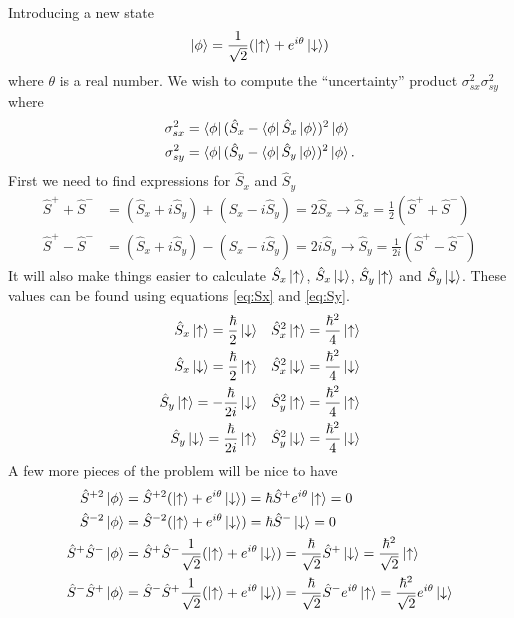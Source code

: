 \documentclass{article}
\begin{document}
Introducing a new state
\begin{equation*}
\ket{\phi}=\frac{1}{\sqrt{2}}(\ket{\uparrow}+e^{i\theta}\ket{\downarrow})
\end{equation*}
where $\theta$ is a real number. We wish to compute the ``uncertainty'' product $\sigma_{sx}^2\sigma_{sy}^2$ where
\begin{align*}
\sigma_{sx}^2 &= \bra{\phi}(\hat{S}_x-\bra{\phi}\hat{S}_x\ket{\phi} )^2\ket{\phi}  \\
\sigma_{sy}^2 &= \bra{\phi}(\hat{S}_y-\bra{\phi}\hat{S}_y\ket{\phi} )^2\ket{\phi}.
\end{align*}
First we need to find expressions for $\hat{S}_x$ and $\hat{S}_y$
\begin{align}
\label{eq:Sx}
\hat{S}^++\hat{S}^- &= (\hat{S}_x + i\hat{S}_y) + (\hat{S}_x-i\hat{S}_y) = 2\hat{S}_x 
\rightarrow \hat{S}_x = \frac{1}{2}(\hat{S}^++\hat{S}^-)\\
\label{eq:Sy}
\hat{S}^+-\hat{S}^- &= (\hat{S}_x + i\hat{S}_y) - (\hat{S}_x-i\hat{S}_y) = 2i\hat{S}_y 
\rightarrow \hat{S}_y = \frac{1}{2i}(\hat{S}^+-\hat{S}^-)
\end{align}
It will also make things easier to calculate $\hat{S}_x\ket{\uparrow}$, $\hat{S}_x\ket{\downarrow}$, $\hat{S}_y\ket{\uparrow}$ and $\hat{S}_y\ket{\downarrow}$. These values can be found using equations \ref{eq:Sx} and \ref{eq:Sy}.
\begin{align*}
\hat{S}_x\ket{\uparrow}		= \frac{\hbar}{2}\ket{\downarrow}& \quad
\hat{S}^2_x\ket{\uparrow}	= \frac{\hbar^2}{4}\ket{\uparrow}\\
\hat{S}_x\ket{\downarrow}	= \frac{\hbar}{2}\ket{\uparrow}& \quad
\hat{S}^2_x\ket{\downarrow}	= \frac{\hbar^2}{4}\ket{\downarrow}\\
\hat{S}_y\ket{\uparrow}		= -\frac{\hbar}{2i}\ket{\downarrow}& \quad
\hat{S}^2_y\ket{\uparrow}	= \frac{\hbar^2}{4}\ket{\uparrow}\\
\hat{S}_y\ket{\downarrow}	= \frac{\hbar}{2i}\ket{\uparrow}& \quad
\hat{S}^2_y\ket{\downarrow}	= \frac{\hbar^2}{4}\ket{\downarrow}\\
\end{align*}
A few more pieces of the problem will be nice to have
\begin{align*}
\hat{S}^{+2}\ket{\phi}&=\hat{S}^{+2}(\ket{\uparrow}+e^{i\theta}\ket{\downarrow})=\hbar\hat{S}^{+}e^{i\theta}\ket{\uparrow}=0 \\
\hat{S}^{-2}\ket{\phi}&=\hat{S}^{-2}(\ket{\uparrow}+e^{i\theta}\ket{\downarrow})=\hbar\hat{S}^{-}\ket{\downarrow}=0 \\
\hat{S}^+\hat{S}^-\ket{\phi}&=\hat{S}^+\hat{S}^-\frac{1}{\sqrt{2}}(\ket{\uparrow}+e^{i\theta}\ket{\downarrow})=\frac{\hbar}{\sqrt{2}}\hat{S}^+\ket{\downarrow} = \frac{\hbar^2}{\sqrt{2}}\ket{\uparrow} \\
\hat{S}^-\hat{S}^+\ket{\phi}&=\hat{S}^-\hat{S}^+\frac{1}{\sqrt{2}}(\ket{\uparrow}+e^{i\theta}\ket{\downarrow})=\frac{\hbar}{\sqrt{2}}\hat{S}^-e^{i\theta}\ket{\uparrow} = \frac{\hbar^2}{\sqrt{2}}e^{i\theta}\ket{\downarrow}
\end{align*}
\end{document}
